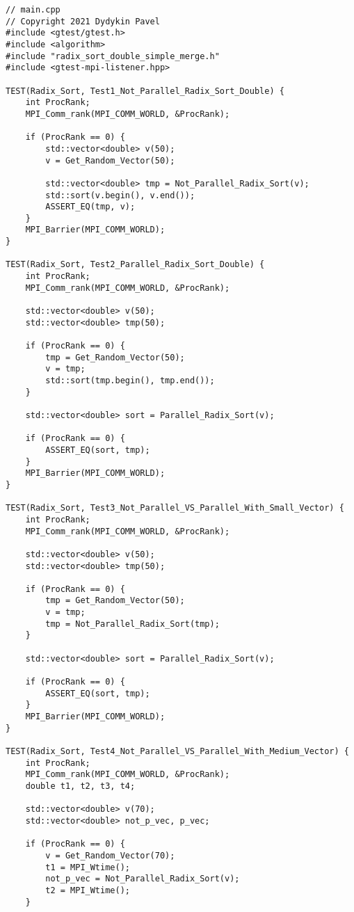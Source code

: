 \documentclass[12pt]{report}
\begin{document}
\begin{lstlisting}
// main.cpp
// Copyright 2021 Dydykin Pavel
#include <gtest/gtest.h>
#include <algorithm>
#include "radix_sort_double_simple_merge.h"
#include <gtest-mpi-listener.hpp>

TEST(Radix_Sort, Test1_Not_Parallel_Radix_Sort_Double) {
    int ProcRank;
    MPI_Comm_rank(MPI_COMM_WORLD, &ProcRank);

    if (ProcRank == 0) {
        std::vector<double> v(50);
        v = Get_Random_Vector(50);

        std::vector<double> tmp = Not_Parallel_Radix_Sort(v);
        std::sort(v.begin(), v.end());
        ASSERT_EQ(tmp, v);
    }
    MPI_Barrier(MPI_COMM_WORLD);
}

TEST(Radix_Sort, Test2_Parallel_Radix_Sort_Double) {
    int ProcRank;
    MPI_Comm_rank(MPI_COMM_WORLD, &ProcRank);

    std::vector<double> v(50);
    std::vector<double> tmp(50);

    if (ProcRank == 0) {
        tmp = Get_Random_Vector(50);
        v = tmp;
        std::sort(tmp.begin(), tmp.end());
    }

    std::vector<double> sort = Parallel_Radix_Sort(v);

    if (ProcRank == 0) {
        ASSERT_EQ(sort, tmp);
    }
    MPI_Barrier(MPI_COMM_WORLD);
}

TEST(Radix_Sort, Test3_Not_Parallel_VS_Parallel_With_Small_Vector) {
    int ProcRank;
    MPI_Comm_rank(MPI_COMM_WORLD, &ProcRank);

    std::vector<double> v(50);
    std::vector<double> tmp(50);

    if (ProcRank == 0) {
        tmp = Get_Random_Vector(50);
        v = tmp;
        tmp = Not_Parallel_Radix_Sort(tmp);
    }

    std::vector<double> sort = Parallel_Radix_Sort(v);

    if (ProcRank == 0) {
        ASSERT_EQ(sort, tmp);
    }
    MPI_Barrier(MPI_COMM_WORLD);
}

TEST(Radix_Sort, Test4_Not_Parallel_VS_Parallel_With_Medium_Vector) {
    int ProcRank;
    MPI_Comm_rank(MPI_COMM_WORLD, &ProcRank);
    double t1, t2, t3, t4;

    std::vector<double> v(70);
    std::vector<double> not_p_vec, p_vec;

    if (ProcRank == 0) {
        v = Get_Random_Vector(70);
        t1 = MPI_Wtime();
        not_p_vec = Not_Parallel_Radix_Sort(v);
        t2 = MPI_Wtime();
    }


\end{lstlisting}
\end{document}

